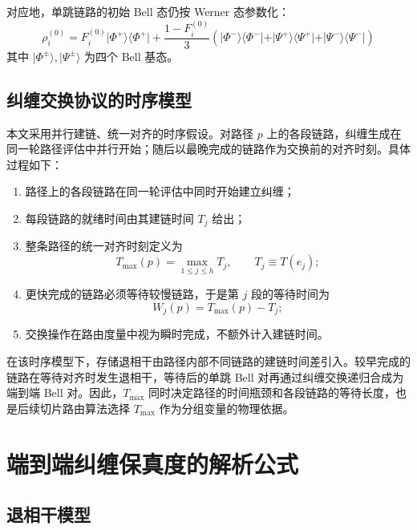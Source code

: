 对应地，单跳链路的初始 Bell 态仍按 Werner 态参数化：
\begin{equation}
  \rho_i^{(0)}
  = F_i^{(0)} \vert\Phi^+\rangle\langle\Phi^+\vert
  + \frac{1 - F_i^{(0)}}{3}
    \left(
      \vert\Phi^-\rangle\langle\Phi^-\vert +
      \vert\Psi^+\rangle\langle\Psi^+\vert +
      \vert\Psi^-\rangle\langle\Psi^-\vert
    \right)
  \label{eq:werner-init}
\end{equation}
其中 $\vert\Phi^\pm\rangle,\vert\Psi^\pm\rangle$ 为四个 Bell 基态。

\subsection{纠缠交换协议的时序模型}

本文采用并行建链、统一对齐的时序假设。对路径 $p$ 上的各段链路，纠缠生成在同一轮路径评估中并行开始；随后以最晚完成的链路作为交换前的对齐时刻。具体过程如下：

\begin{enumerate}
  \item 路径上的各段链路在同一轮评估中同时开始建立纠缠；
  \item 每段链路的就绪时间由其建链时间 $T_j$ 给出；
  \item 整条路径的统一对齐时刻定义为
  \begin{equation}
    T_{\max}(p) = \max_{1 \le j \le h} T_j,
    \qquad T_j \equiv T(e_j);
    \label{eq:path-tmax}
  \end{equation}
  \item 更快完成的链路必须等待较慢链路，于是第 $j$ 段的等待时间为
  \begin{equation}
    W_j(p) = T_{\max}(p) - T_j;
    \label{eq:path-wait}
  \end{equation}
  \item 交换操作在路由度量中视为瞬时完成，不额外计入建链时间。
\end{enumerate}

在该时序模型下，存储退相干由路径内部不同链路的建链时间差引入。较早完成的链路在等待对齐时发生退相干，等待后的单跳 Bell 对再通过纠缠交换递归合成为端到端 Bell 对。因此，$T_{\max}$ 同时决定路径的时间瓶颈和各段链路的等待长度，也是后续切片路由算法选择 $T_{\max}$ 作为分组变量的物理依据。

\section{端到端纠缠保真度的解析公式}
\label{sec:fidelity-formula}

\subsection{退相干模型}

